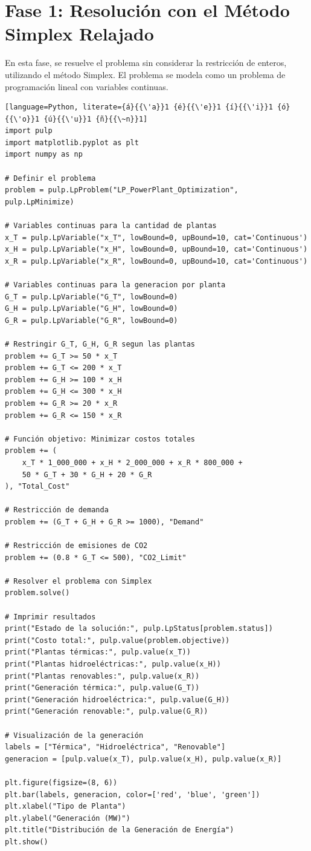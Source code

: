 \documentclass{article}
\begin{document}
\section*{Fase 1: Resolución con el Método Simplex Relajado}
En esta fase, se resuelve el problema sin considerar la restricción de enteros, utilizando el método Simplex. El problema se modela como un problema de programación lineal con variables continuas.
\\
\begin{lstlisting}[language=Python, literate={á}{{\'a}}1 {é}{{\'e}}1 {í}{{\'i}}1 {ó}{{\'o}}1 {ú}{{\'u}}1 {ñ}{{\~n}}1]
import pulp
import matplotlib.pyplot as plt
import numpy as np

# Definir el problema
problem = pulp.LpProblem("LP_PowerPlant_Optimization", pulp.LpMinimize)

# Variables continuas para la cantidad de plantas
x_T = pulp.LpVariable("x_T", lowBound=0, upBound=10, cat='Continuous')
x_H = pulp.LpVariable("x_H", lowBound=0, upBound=10, cat='Continuous')
x_R = pulp.LpVariable("x_R", lowBound=0, upBound=10, cat='Continuous')

# Variables continuas para la generacion por planta
G_T = pulp.LpVariable("G_T", lowBound=0)
G_H = pulp.LpVariable("G_H", lowBound=0)
G_R = pulp.LpVariable("G_R", lowBound=0)

# Restringir G_T, G_H, G_R segun las plantas
problem += G_T >= 50 * x_T
problem += G_T <= 200 * x_T
problem += G_H >= 100 * x_H
problem += G_H <= 300 * x_H
problem += G_R >= 20 * x_R
problem += G_R <= 150 * x_R

# Función objetivo: Minimizar costos totales
problem += (
    x_T * 1_000_000 + x_H * 2_000_000 + x_R * 800_000 +
    50 * G_T + 30 * G_H + 20 * G_R
), "Total_Cost"

# Restricción de demanda
problem += (G_T + G_H + G_R >= 1000), "Demand"

# Restricción de emisiones de CO2
problem += (0.8 * G_T <= 500), "CO2_Limit"

# Resolver el problema con Simplex
problem.solve()

# Imprimir resultados
print("Estado de la solución:", pulp.LpStatus[problem.status])
print("Costo total:", pulp.value(problem.objective))
print("Plantas térmicas:", pulp.value(x_T))
print("Plantas hidroeléctricas:", pulp.value(x_H))
print("Plantas renovables:", pulp.value(x_R))
print("Generación térmica:", pulp.value(G_T))
print("Generación hidroeléctrica:", pulp.value(G_H))
print("Generación renovable:", pulp.value(G_R))

# Visualización de la generación 
labels = ["Térmica", "Hidroeléctrica", "Renovable"]
generacion = [pulp.value(x_T), pulp.value(x_H), pulp.value(x_R)]

plt.figure(figsize=(8, 6))
plt.bar(labels, generacion, color=['red', 'blue', 'green'])
plt.xlabel("Tipo de Planta")
plt.ylabel("Generación (MW)")
plt.title("Distribución de la Generación de Energía")
plt.show()
\end{lstlisting}
\end{document}
